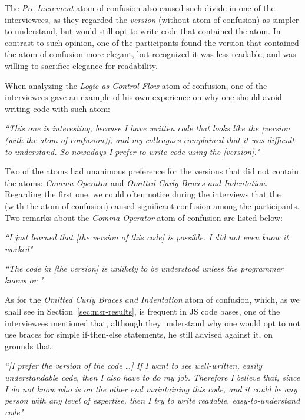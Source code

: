 
The \emph{Pre-Increment} atom of confusion also caused such divide in one of the interviewees, as they regarded the \emph{\rhs version} (without atom of confusion) as simpler to understand, but would still opt to write code that contained the atom. In contrast to such opinion, one of the participants found the version that contained the atom of confusion more elegant, but recognized it was less readable, and was willing to sacrifice elegance for readability.

When analyzing the \emph{Logic as Control Flow} atom of confusion, one of the interviewees gave an example of his own experience on why one should avoid writing code with such atom:

\begin{mq}
\emph{``This one is interesting, because I have written code that looks like the [\lhs version (with the atom of confusion)], and my colleagues complained that it was difficult to understand. So nowadays I prefer to write code using the [\rhs version]."}
\end{mq}

Two of the atoms had unanimous preference for the versions that did not contain the atoms: \emph{Comma Operator} and \emph{Omitted Curly Braces and Indentation}. Regarding the first one, we could often notice during the interviews that the \emph{\lhs} (with the atom of confusion) caused significant confusion among the participants. Two remarks about the \emph{Comma Operator} atom of confusion are listed below:

\begin{mq}
\emph{``I just learned that [the \lhs version of this code] is possible. I did not even know it worked"}
\end{mq}

\begin{mq}
\emph{``The code in [the \lhs version] is unlikely to be understood unless the programmer knows \clang or \cpplang"}
\end{mq}

As for the \emph{Omitted Curly Braces and Indentation} atom of confusion, which, as we shall see in Section~\ref{sec:msr-results}, is frequent in JS code bases, one of the interviewees mentioned that, although they understand why one would opt to not use braces for simple if-then-else statements, he still advised against it, on grounds that:

\begin{mq}
\emph{``[I prefer the \rhs version of the code \ldots] If I want to see well-written, easily understandable code, then I also have to do my job. Therefore I believe that, since I do not know who is on the other end maintaining this code, and it could be any person with any level of expertise, then I try to write readable, easy-to-understand code"}
\end{mq}


